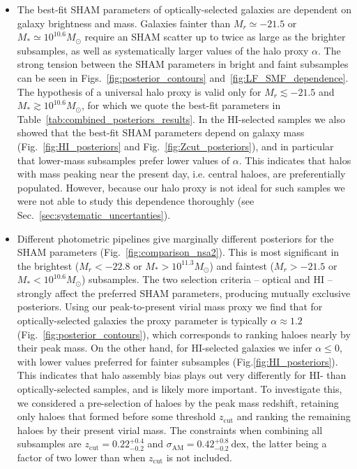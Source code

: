 \documentclass[usenatbib,useAMS]{mnras}
\newcommand{\zcut}{\ensuremath{z_{\mathrm{cut}}}}
\newcommand{\HI}{\ensuremath{\mathrm{H}\scriptstyle\mathrm{I}}}
\newcommand{\scatter}{\ensuremath{\sigma_{\mathrm{AM}}}}
\begin{document}
\begin{itemize}
    \item The best-fit \ac{SHAM} parameters of optically-selected galaxies are dependent on galaxy brightness and mass. Galaxies fainter than $M_r \simeq - 21.5$ or $M_* \simeq 10^{10.6} M_\odot$ require an \ac{SHAM} scatter up to twice as large as the brighter subsamples, as well as systematically larger values of the halo proxy $\alpha$. The strong tension between the \ac{SHAM} parameters in bright and faint subsamples can be seen in Figs.~\ref{fig:posterior_contours} and~\ref{fig:LF_SMF_dependence}. The hypothesis of a universal halo proxy is valid only for $M_r \lesssim - 21.5$ and $M_* \gtrsim 10^{10.6} M_\odot$, for which we quote the best-fit parameters in Table~\ref{tab:combined_posteriors_results}. In the $\HI$-selected samples we also showed that the best-fit \ac{SHAM} parameters depend on galaxy mass (Fig.~\ref{fig:HI_posteriors} and Fig.~\ref{fig:Zcut_posteriors}), and in particular that lower-mass subsamples prefer lower values of $\alpha$. This indicates that halos with mass peaking near the present day, i.e. central haloes, are preferentially populated. However, because our halo proxy is not ideal for such samples we were not able to study this dependence thoroughly (see Sec.~\ref{sec:systematic_uncertanties}).
    \item Different photometric pipelines give marginally different posteriors for the \ac{SHAM} parameters (Fig.~\ref{fig:comparison_nsa2}). This is most significant in the brightest ($M_r < -22.8$ or $M_* > 10^{11.3} M_\odot$) and faintest ($M_r > -21.5$ or $M_* < 10^{10.6} M_\odot$) subsamples. The two selection criteria -- optical and $\HI$ -- strongly affect the preferred \ac{SHAM} parameters, producing mutually exclusive posteriors. Using our peak-to-present virial mass proxy we find that for optically-selected galaxies the proxy parameter is typically $\alpha \approx 1.2$ (Fig.~\ref{fig:posterior_contours}), which corresponds to ranking haloes nearly by their peak mass. On the other hand, for $\HI$-selected galaxies we infer $\alpha \leq 0$, with lower values preferred for fainter subsamples (Fig.\ref{fig:HI_posteriors}). This indicates that halo assembly bias plays out very differently for $\HI$- than optically-selected samples, and is likely more important. To investigate this, we considered a pre-selection of haloes by the peak mass redshift, retaining only haloes that formed before some threshold $\zcut$ and ranking the remaining haloes by their present virial mass. The constraints when combining all subsamples are $\zcut = 0.22^{+0.4}_{-0.2}$ and $\scatter = 0.42^{+0.8}_{-0.2}~\mathrm{dex}$, the latter being a factor of two lower than when $\zcut$ is not included.

\end{itemize}
\end{document}
